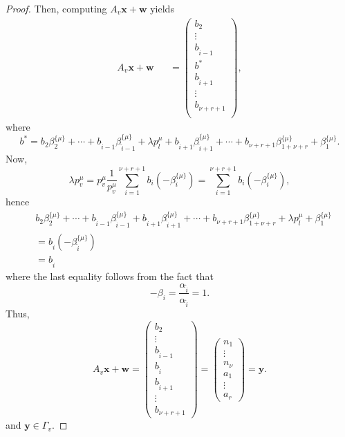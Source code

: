 \begin{proof}
Then, computing $A_{v}\mathbf{x} + \mathbf{w}$ yields
\begin{align*}
 A_{v}\mathbf{x} + \mathbf{w} &
& = \begin{pmatrix}
b_2 \\ \vdots \\ b_{\hat{i} -1} \\ 
 b^* \\
b_{\hat{i} +1} \\ \vdots \\ b_{\nu+r+1} \\
\end{pmatrix},
\end{align*}
where 
\[b^* =b_2\beta_2^{\{\mu\}} + \cdots + b_{\hat{i} - 1}\beta_{\hat{i} - 1}^{\{\mu\}} + \lambda p_l^{\mu} + b_{\hat{i} + 1}\beta_{\hat{i} + 1}^{\{\mu\}} + \cdots + b_{\nu+r+ 1}\beta_{1+\nu+r}^{\{\mu\}} + \beta_1^{\{\mu\}}.\]
Now, 
\[ \lambda p_v^{\mu} = p_v^{\mu}\frac{1}{p_v^{\mu}}\sum_{i = 1}^{\nu + r + 1}b_i(-\beta_i^{\{\mu\}}) = \sum_{i = 1}^{\nu + r + 1}b_i(-\beta_i^{\{\mu\}}),\]
hence
\begin{align*}
& b_2\beta_2^{\{\mu\}} + \cdots + b_{\hat{i} - 1}\beta_{\hat{i} - 1}^{\{\mu\}} + b_{\hat{i} + 1}\beta_{\hat{i} + 1}^{\{\mu\}} + \cdots + b_{\nu+r+ 1}\beta_{1+\nu+r}^{\{\mu\}} + \lambda p_l^{\mu} + \beta_1^{\{\mu\}}\\
& = b_{\hat{i}}(-\beta_{\hat{i}}^{\{\mu\}})\\
& = b_{\hat{i}}
\end{align*}
where the last equality follows from the fact that 
\[-\beta_i = \frac{\alpha_{\hat{i}}}{\alpha_{\hat{i}}} =1.\]
Thus, 
\[A_{v}\mathbf{x} + \mathbf{w} = \begin{pmatrix}
b_2 \\ \vdots \\ b_{\hat{i} -1} \\ b_{\hat{i}} \\ b_{\hat{i} +1} \\ \vdots \\ b_{\nu+r+1}
\end{pmatrix} = 
\begin{pmatrix}
n_1 \\ \vdots \\ n_{\nu} \\ a_1 \\ \vdots \\ a_r \end{pmatrix} = \mathbf{y}.\]
and $\mathbf{y} \in \Gamma_v$. 

\end{proof}


